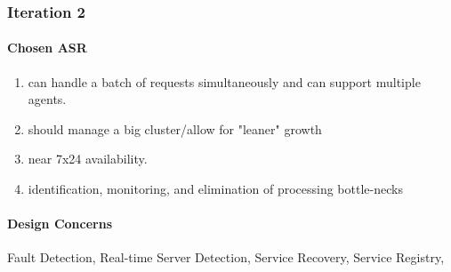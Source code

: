 \documentclass{article}
\begin{document}


		\subsubsection{Iteration 2}
			\paragraph{Chosen ASR}
			\begin{enumerate}
			\item can handle a batch of requests simultaneously and can support multiple agents.
			\item should manage a big cluster/allow for "leaner" growth
			\item near 7x24 availability.
			\item identification, monitoring, and elimination of processing bottle-necks
			\end{enumerate}
			\paragraph{Design Concerns}
			Fault Detection,
			Real-time Server Detection,
			Service Recovery,
			Service Registry,
\end{document}
